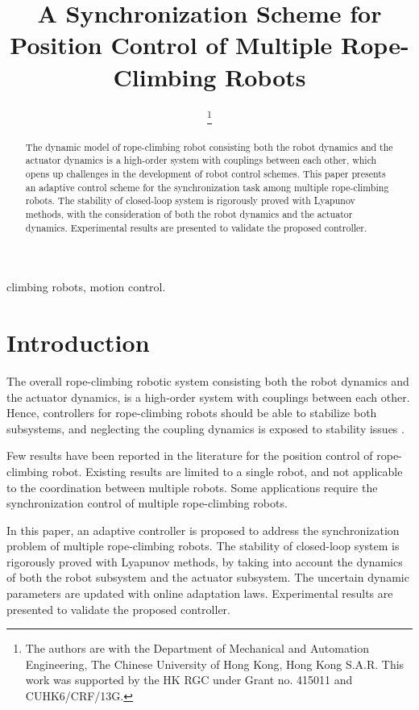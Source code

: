\documentclass[letterpaper, 10 pt, conference]{ieeeconf}
\title{\LARGE \bf A Synchronization Scheme for Position Control of Multiple Rope-Climbing Robots}
\author{
\thanks{The authors are with the Department of Mechanical and Automation
Engineering, The Chinese University of Hong Kong, Hong Kong S.A.R.
This work was
supported by the HK RGC under Grant no. 415011 and
CUHK6/CRF/13G.}}
\begin{document}
\maketitle

\begin{abstract}
The dynamic model of rope-climbing robot
consisting both the robot dynamics and the actuator dynamics is
a high-order system with couplings between each other, which opens
up challenges in the development of robot control schemes.
This paper presents an adaptive control scheme for the synchronization task among multiple rope-climbing robots.
The stability of closed-loop system is rigorously proved with
Lyapunov methods, with the consideration of both the robot
dynamics and the actuator dynamics.
Experimental results are
presented to validate the proposed controller.
\end{abstract}
\begin{keywords}climbing robots, motion control.\end{keywords}

\section{Introduction}
The overall rope-climbing robotic system
consisting both the robot dynamics and the actuator dynamics,
is a high-order system with couplings between each other. Hence, controllers for rope-climbing robots should be
able to stabilize both subsystems, and neglecting the coupling
dynamics is exposed to stability issues \cite{ram15_petit}.

Few results have been reported in the literature for the position control of rope-climbing robot. Existing results are limited to a single robot, and not applicable to the coordination between multiple robots. Some applications require the synchronization control of multiple rope-climbing robots.

In this paper, an adaptive controller is proposed to address the synchronization problem of multiple rope-climbing robots.
The stability of closed-loop system is rigorously proved with
Lyapunov methods, by taking into account the dynamics of both the
robot subsystem and the actuator subsystem. The uncertain dynamic parameters are updated with online adaptation laws. Experimental results are presented to validate the proposed controller.
\end{document}
